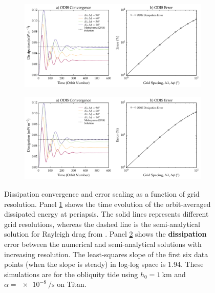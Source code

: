 \begin{figure}[!t]
    \centering
    \begin{subfigure}[t]{\linewidth} %
        \includegraphics[width=\linewidth]{Figures/convergence2}
        \label{fig:conv_a}
    \end{subfigure}
    \begin{subfigure}[t]{0\linewidth} %
         \includegraphics[width=\linewidth]{Figures/convergence2}
         \label{fig:conv_b}   
    \end{subfigure}
    \vspace{-0.5cm}
\caption{Dissipation convergence and error scaling as a function of grid resolution. Panel \ref{fig:conv_a} shows the time evolution of the orbit-averaged dissipated energy at periapsis. The solid lines represents different grid resolutions, whereas the dashed line is the semi-analytical solution for Rayleigh drag from \citet{matsuyama2014tidal}. Panel \ref{fig:conv_b} shows the \textbf{dissipation} error between the numerical and semi-analytical solutions with increasing resolution. The least-squares slope of the first six data points (when the slope is steady) in log-log space is \num{1.94}. These simulations are for the obliquity tide using $h_0 = \SI{1}{\kilo\metre}$ and $\alpha = \SI{e-8}{\per\second}$ on Titan. \label{fig:conv}}
\end{figure}


